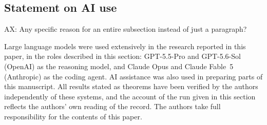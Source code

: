 \subsection*{Statement on AI use}
{\color{red}AX: Any specific reason for an entire subsection instead of just a paragraph?}

Large language models were used extensively in the research reported in
this paper, in the roles described in this section: GPT-5.5-Pro and
GPT-5.6-Sol (OpenAI) as the reasoning model, and Claude Opus and Claude
Fable~5 (Anthropic) as the coding agent. AI assistance was also used in
preparing parts of this manuscript. All results stated as theorems have been
verified by the authors independently of these systems, and the account of
the run given in this section reflects the authors' own reading of the
record. The authors take full responsibility for the contents of this
paper.

